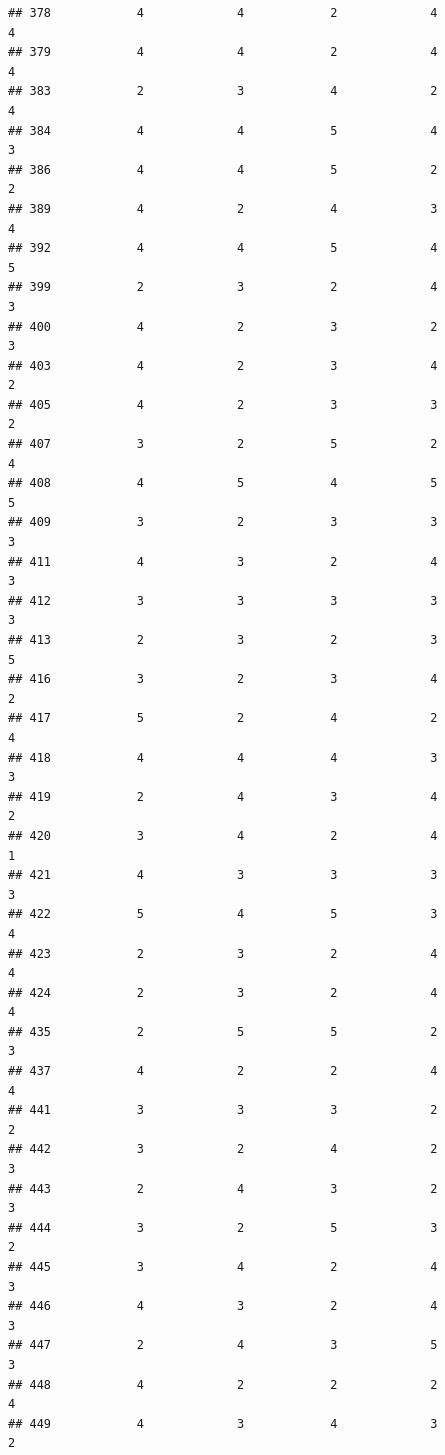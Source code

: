 \documentclass[
]{article}
\begin{document}
\begin{verbatim}
## 378            4             4            2             4          4
## 379            4             4            2             4          4
## 383            2             3            4             2          4
## 384            4             4            5             4          3
## 386            4             4            5             2          2
## 389            4             2            4             3          4
## 392            4             4            5             4          5
## 399            2             3            2             4          3
## 400            4             2            3             2          3
## 403            4             2            3             4          2
## 405            4             2            3             3          2
## 407            3             2            5             2          4
## 408            4             5            4             5          5
## 409            3             2            3             3          3
## 411            4             3            2             4          3
## 412            3             3            3             3          3
## 413            2             3            2             3          5
## 416            3             2            3             4          2
## 417            5             2            4             2          4
## 418            4             4            4             3          3
## 419            2             4            3             4          2
## 420            3             4            2             4          1
## 421            4             3            3             3          3
## 422            5             4            5             3          4
## 423            2             3            2             4          4
## 424            2             3            2             4          4
## 435            2             5            5             2          3
## 437            4             2            2             4          4
## 441            3             3            3             2          2
## 442            3             2            4             2          3
## 443            2             4            3             2          3
## 444            3             2            5             3          2
## 445            3             4            2             4          3
## 446            4             3            2             4          3
## 447            2             4            3             5          3
## 448            4             2            2             2          4
## 449            4             3            4             3          2

\end{verbatim}
\end{document}
